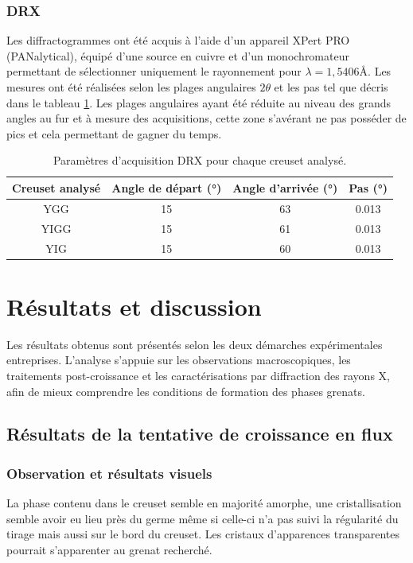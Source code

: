 \documentclass{rapportENSCP}
\begin{document}
\subsubsection{DRX}
Les diffractogrammes ont été acquis à l’aide d’un appareil XPert PRO (PANalytical), équipé d’une source en cuivre et d’un monochromateur permettant de sélectionner uniquement le rayonnement pour $\lambda = 1,5406$\AA. Les mesures ont été réalisées selon les plages angulaires $2\theta$ et les pas tel que décris dans le tableau \ref{tab:param_drx}. Les plages angulaires ayant été réduite au niveau des grands angles au fur et à mesure des acquisitions, cette zone s'avérant ne pas posséder de pics et cela permettant de gagner du temps.

\begin{table}[h]
    \centering
    \begin{tabular}{|c|c|c|c|}
        \hline
        Creuset analysé & Angle de départ (°) & Angle d'arrivée (°) & Pas (°) \\
        \hline
        YGG & 15 & 63 & 0.013 \\
        \hline
        YIGG & 15 & 61 & 0.013 \\
        \hline
        YIG & 15 & 60 & 0.013 \\
        \hline
    \end{tabular}
    \caption{Paramètres d’acquisition DRX pour chaque creuset analysé.}
    \label{tab:param_drx}
\end{table}

\section{Résultats et discussion}
Les résultats obtenus sont présentés selon les deux démarches expérimentales entreprises. L’analyse s’appuie sur les observations macroscopiques, les traitements post-croissance et les caractérisations par diffraction des rayons X, afin de mieux comprendre les conditions de formation des phases grenats.



\subsection{Résultats de la tentative de croissance en flux}
\subsubsection{Observation et résultats visuels}
La phase contenu dans le creuset semble en majorité amorphe, une cristallisation semble avoir eu lieu près du germe même si celle-ci n'a pas suivi la régularité du tirage mais aussi sur le bord du creuset. Les cristaux d'apparences transparentes pourrait s'apparenter au grenat recherché.
\end{document}
